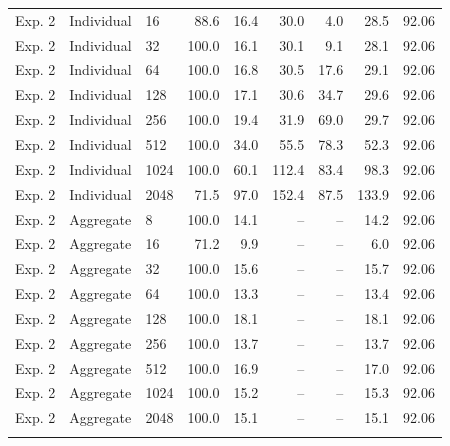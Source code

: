 \begin{table}[!t]
\begin{tabular}{@{}lllrrrrrr@{}}
Exp. 2 & Individual & 16 & 88.6 & 16.4 & 30.0 & 4.0 & 28.5 & 92.06 \\
Exp. 2 & Individual & 32 & 100.0 & 16.1 & 30.1 & 9.1 & 28.1 & 92.06 \\
Exp. 2 & Individual & 64 & 100.0 & 16.8 & 30.5 & 17.6 & 29.1 & 92.06 \\
Exp. 2 & Individual & 128 & 100.0 & 17.1 & 30.6 & 34.7 & 29.6 & 92.06 \\
Exp. 2 & Individual & 256 & 100.0 & 19.4 & 31.9 & 69.0 & 29.7 & 92.06 \\
Exp. 2 & Individual & 512 & 100.0 & 34.0 & 55.5 & 78.3 & 52.3 & 92.06 \\
Exp. 2 & Individual & 1024 & 100.0 & 60.1 & 112.4 & 83.4 & 98.3 & 92.06 \\
Exp. 2 & Individual & 2048 & 71.5 & 97.0 & 152.4 & 87.5 & 133.9 & 92.06 \\
\addlinespace[2pt]
Exp. 2 & Aggregate & 8 & 100.0 & 14.1 & -- & -- & 14.2 & 92.06 \\
Exp. 2 & Aggregate & 16 & 71.2 & 9.9 & -- & -- & 6.0 & 92.06 \\
Exp. 2 & Aggregate & 32 & 100.0 & 15.6 & -- & -- & 15.7 & 92.06 \\
Exp. 2 & Aggregate & 64 & 100.0 & 13.3 & -- & -- & 13.4 & 92.06 \\
Exp. 2 & Aggregate & 128 & 100.0 & 18.1 & -- & -- & 18.1 & 92.06 \\
Exp. 2 & Aggregate & 256 & 100.0 & 13.7 & -- & -- & 13.7 & 92.06 \\
Exp. 2 & Aggregate & 512 & 100.0 & 16.9 & -- & -- & 17.0 & 92.06 \\
Exp. 2 & Aggregate & 1024 & 100.0 & 15.2 & -- & -- & 15.3 & 92.06 \\
Exp. 2 & Aggregate & 2048 & 100.0 & 15.1 & -- & -- & 15.1 & 92.06 \\
\addlinespace[2pt]
\bottomrule
\end{tabular}
\end{table}

